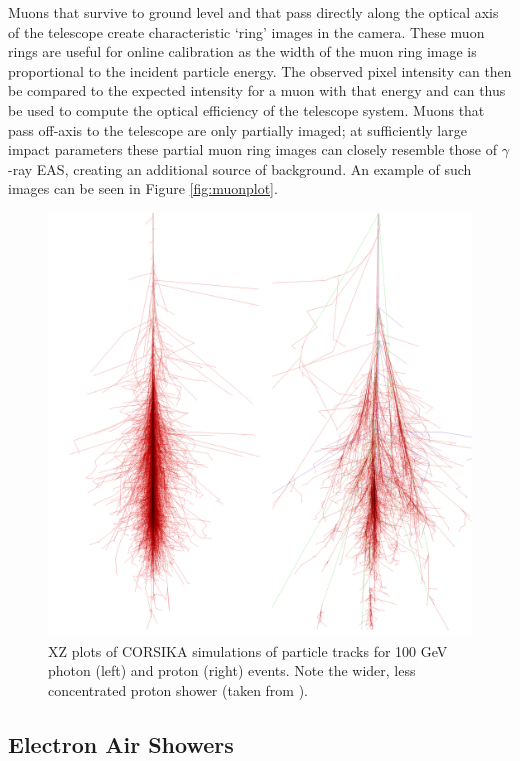 Muons that survive to ground level and that pass directly along the optical axis of the telescope create characteristic `ring' images in the camera. These muon rings are useful for online calibration as the width of the muon ring image is proportional to the incident particle energy. The observed pixel intensity can then be compared to the expected intensity for a muon with that energy and can thus be used to compute the optical efficiency of the telescope system. Muons that pass off-axis to the telescope are only partially imaged; at sufficiently large impact parameters these partial muon ring images can closely resemble those of $\gamma$-ray EAS, creating an additional source of background. An example of such images can be seen in Figure \ref{fig:muonplot}.

\begin{figure}
\begin{center}  

\includegraphics[width=0.5\columnwidth,trim=4 4 30 4,clip]{figures/showers.png}
 
\caption{XZ plots of CORSIKA simulations of particle tracks for 100 GeV photon (left) and proton (right) events. Note the wider, less concentrated proton shower (taken from \cite{corskplot}).}
\label{fig:image2}
\end{center}
\end{figure}
\subsection{Electron Air Showers}

